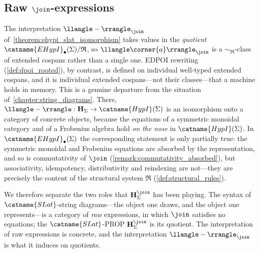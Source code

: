 
\subsection{Raw \texorpdfstring{$\join$}{join}-expressions}

The interpretation $\llangle - \rrangle_{\join}$ of~\cref{theorem:ehypi_slat_isomorphism}
takes values in the \emph{quotient} $\catname{EHypI}_{\bullet}(\Sigma)/\mathfrak{R}$, so
$\llangle \corner{a} \rrangle_{\join}$ is a $\sim_{\mathfrak{R}}$-class of extended
cospans rather than a single one.
EDPOI rewriting (\cref{def:dpoi_rooted}), by contrast, is defined on individual
well-typed extended cospans, and it is individual extended cospans---not their
classes---that a machine holds in memory.
This is a genuine departure from the situation of~\cref{chapter:string_diagrams}.
There, $\llangle - \rrangle : \mathbf{H}_{\Sigma} \to \catname{HypI}(\Sigma)$ is an
isomorphism onto a category of concrete objects, because the equations of a symmetric
monoidal category and of a Frobenius algebra hold \emph{on the nose} in
$\catname{HypI}(\Sigma)$.
In $\catname{EHypI}_{\bullet}(\Sigma)$ the corresponding statement is only partially
true: the symmetric monoidal and Frobenius equations are absorbed by the
representation, and so is commutativity of $\join$ (\cref{remark:commutativity_absorbed}),
but associativity, idempotency, distributivity and reindexing are not---they are
precisely the content of the structural system $\mathfrak{R}$
(\cref{def:structural_rules}).

We therefore separate the two roles that $\mathbf{H}^{\join}_{\Sigma}$ has been playing.
The syntax of $\catname{SLat}$-string diagrams---the object one draws, and the object
one represents---is a category of \emph{raw} expressions, in which $\join$ satisfies no
equations; the $\catname{SLat}$-PROP $\mathbf{H}^{\join}_{\Sigma}$ is its quotient.
The interpretation of raw expressions is concrete, and the interpretation
$\llangle - \rrangle_{\join}$ is what it induces on quotients.

